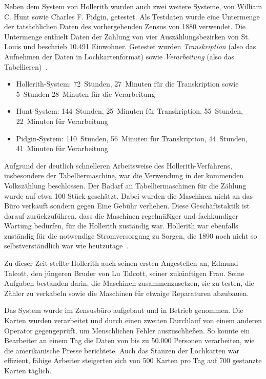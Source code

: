 \documentclass[parskip=half]{scrartcl}
\begin{document}
Neben dem System von Hollerith wurden auch zwei weitere Systeme, von William C.
Hunt sowie Charles F. Pidgin, getestet. Als Testdaten wurde eine Untermenge der
tatsächlichen Daten des vorhergehenden Zensus von 1880 verwendet. Die
Untermenge enthielt Daten der Zählung von vier Auszählungsbezirken von St.
Louis und beschrieb 10.491 Einwohner. Getestet wurden \emph{Transkription}
(also das Aufnehmen der Daten in Lochkartenformat) sowie \emph{Verarbeitung}
(also das Tabellieren)~\cite{austrian1982herman}.

\begin{itemize}
  \item Hollerith-System: 72~Stunden, 27~Minuten für die Transkription sowie
    5~Stunden 28~Minuten für die Verarbeitung
  \item Hunt-System: 144~Stunden, 25~Minuten für Transkription, 55~Stunden,
    22~Minuten für Verarbeitung
  \item Pidgin-System: 110~Stunden, 56~Minuten für Transkription,
    44~Stunden, 41~Minuten für Verarbeitung
\end{itemize}

Aufgrund der deutlich schnelleren Arbeitsweise des Hollerith-Verfahrens,
insbesondere der Tabelliermaschine, war die Verwendung in der kommenden
Volkszählung beschlossen. Der Badarf an Tabelliermaschinen für die Zählung
wurde auf etwa 100 Stück geschätzt. Dabei wurden die Maschinen nicht an das
Büro verkauft sondern gegen Eine Gebühr verliehen. Diese Geschäftstaktik ist
darauf zurückzuführen, dass die Maschinen regelmäßiger und fachkundiger Wartung
bedürfen, für die Hollerith zuständig war. Hollerith war ebenfalls zuständig
für die notwendige Stromversorgung zu Sorgen, die 1890 noch nicht so
selbstverständlich war wie heutzutage~\cite{austrian1982herman}.

Zu dieser Zeit stellte Hollerith auch seinen ersten Angestellen an, Edmund
Talcott, den jüngeren Bruder von Lu Talcott, seiner zukünftigen Frau. Seine
Aufgaben bestanden darin, die Maschinen zusammenzusetzen, sie zu testen, die
Zähler zu verkabeln sowie die Maschinen für etwaige Reparaturen abzubauen.

Das System wurde im Zensusbüro aufgebaut und in Betrieb genommen. Die Karten
wurden verarbeitet und durch einen zweiten Durchlauf von einem anderen Operator
gegengeprüft, um Menschlichen Fehler auszuschließen. So konnte ein Bearbeiter
an einem Tag die Daten von bis zu 50.000 Personen verarbeiten, wie die
amerikanische Presse berichtete. Auch das Stanzen der Lochkarten war effizient,
fähige Arbeiter steigerten sich von 500 Karten pro Tag auf 700 gestanzte Karten
täglich.
\end{document}
